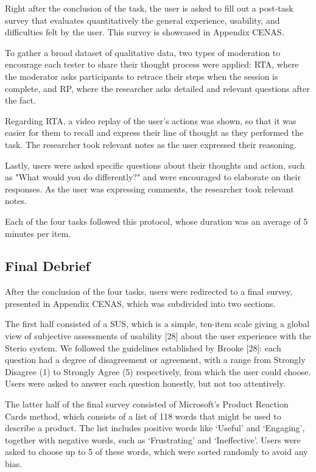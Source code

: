 Right after the conclusion of the task, the user is asked to fill out a post-task survey that evaluates quantitatively the general experience, usability, and difficulties felt by the user. This survey is showcased in Appendix CENAS.

To gather a broad dataset of qualitative data, two types of moderation to encourage each tester to share their thought process were applied: \ac{RTA}, where the moderator asks participants to retrace their steps when the session is complete, and \ac{RP}, where the researcher asks detailed and relevant questions after the fact.

Regarding \ac{RTA}, a video replay of the user's actions was shown, so that it was easier for them to recall and express their line of thought as they performed the task. The researcher took relevant notes as the user expressed their reasoning.

Lastly, users were asked specific questions about their thoughts and action, such as "What would you do differently?" and were encouraged to elaborate on their responses. As the user was expressing comments, the researcher took relevant notes.

Each of the four tasks followed this protocol, whose duration was an average of 5 minutes per item. 

\subsection{Final Debrief}
\label{sub:final}

After the conclusion of the four tasks, users were redirected to a final survey, presented in Appendix CENAS, which was subdivided into two sections. 

The first half consisted of a \ac{SUS}, which is a simple, ten-item scale giving a global view of subjective assessments of usability [28] about the user experience with the Sterio system. We followed the guidelines established by Brooke [28]: each question had a degree of disagreement or agreement, with a range from Strongly Disagree (1) to Strongly Agree (5) respectively, from which the user could choose. Users were asked to answer each question honestly, but not too attentively.

The latter half of the final survey consisted of Microsoft's Product Reaction Cards method, which consists of a list of 118 words that might be used to describe a product. The list includes positive words like ‘Useful’ and ‘Engaging’, together with negative words, such as ‘Frustrating’ and ‘Ineffective’. Users were asked to choose up to 5 of these words, which were sorted randomly to avoid any bias.

